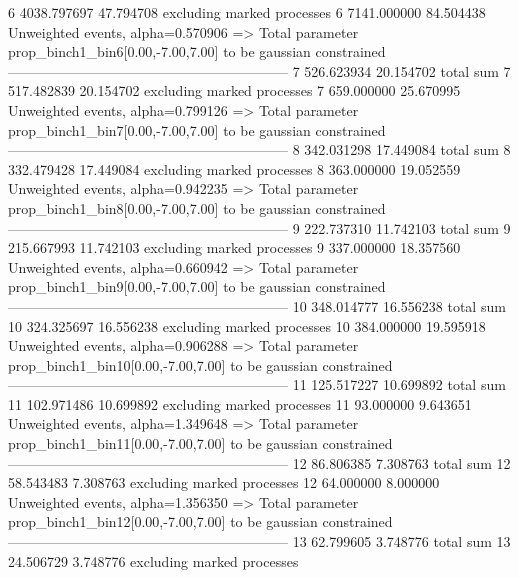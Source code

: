 6          4038.797697     47.794708       excluding marked processes    
6          7141.000000     84.504438       Unweighted events, alpha=0.570906
  => Total parameter prop_binch1_bin6[0.00,-7.00,7.00] to be gaussian constrained
------------------------------------------------------------
7          526.623934      20.154702       total sum                     
7          517.482839      20.154702       excluding marked processes    
7          659.000000      25.670995       Unweighted events, alpha=0.799126
  => Total parameter prop_binch1_bin7[0.00,-7.00,7.00] to be gaussian constrained
------------------------------------------------------------
8          342.031298      17.449084       total sum                     
8          332.479428      17.449084       excluding marked processes    
8          363.000000      19.052559       Unweighted events, alpha=0.942235
  => Total parameter prop_binch1_bin8[0.00,-7.00,7.00] to be gaussian constrained
------------------------------------------------------------
9          222.737310      11.742103       total sum                     
9          215.667993      11.742103       excluding marked processes    
9          337.000000      18.357560       Unweighted events, alpha=0.660942
  => Total parameter prop_binch1_bin9[0.00,-7.00,7.00] to be gaussian constrained
------------------------------------------------------------
10         348.014777      16.556238       total sum                     
10         324.325697      16.556238       excluding marked processes    
10         384.000000      19.595918       Unweighted events, alpha=0.906288
  => Total parameter prop_binch1_bin10[0.00,-7.00,7.00] to be gaussian constrained
------------------------------------------------------------
11         125.517227      10.699892       total sum                     
11         102.971486      10.699892       excluding marked processes    
11         93.000000       9.643651        Unweighted events, alpha=1.349648
  => Total parameter prop_binch1_bin11[0.00,-7.00,7.00] to be gaussian constrained
------------------------------------------------------------
12         86.806385       7.308763        total sum                     
12         58.543483       7.308763        excluding marked processes    
12         64.000000       8.000000        Unweighted events, alpha=1.356350
  => Total parameter prop_binch1_bin12[0.00,-7.00,7.00] to be gaussian constrained
------------------------------------------------------------
13         62.799605       3.748776        total sum                     
13         24.506729       3.748776        excluding marked processes    

